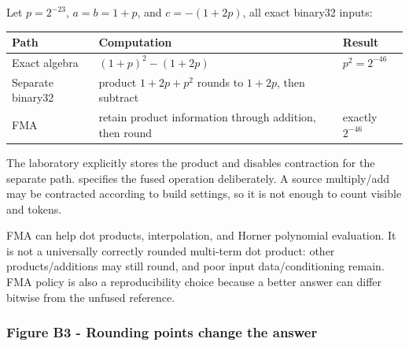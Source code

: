 Let \(p=2^{-23}\), \(a=b=1+p\), and \(c=-(1+2p)\), all exact binary32 inputs:

{\def\LTcaptype{none} %
\begin{longtable}[]{@{}
  >{\raggedright\arraybackslash}p{}
  >{\raggedright\arraybackslash}p{}
  >{\raggedright\arraybackslash}p{}@{}}
\toprule\noalign{}
\begin{minipage}[b]{\linewidth}\raggedright
Path
\end{minipage} & \begin{minipage}[b]{\linewidth}\raggedright
Computation
\end{minipage} & \begin{minipage}[b]{\linewidth}\raggedright
Result
\end{minipage} \\
\midrule\noalign{}
\endhead
\bottomrule\noalign{}
\endlastfoot
Exact algebra & \((1+p)^2-(1+2p)\) & \(p^2=2^{-46}\) \\
Separate binary32 & product \(1+2p+p^2\) rounds to \(1+2p\), then subtract & 0 \\
FMA & retain product information through addition, then round & exactly \(2^{-46}\) \\
\end{longtable}
}

The laboratory explicitly stores the product and disables contraction for the separate path.  specifies the fused operation deliberately. A source multiply/add may be contracted according to build settings, so it is not enough to count visible \BookInlineCode{*} and \BookInlineCode{+} tokens.

FMA can help dot products, interpolation, and Horner polynomial evaluation. It is not a universally correctly rounded multi-term dot product: other products/additions may still round, and poor input data/conditioning remain. FMA policy is also a reproducibility choice because a better answer can differ bitwise from the unfused reference.

\subsubsection{Figure B3 - Rounding points change the answer}\label{01-foundations-i-ch001-figure-b3---rounding-points-change-the-answer}

\hypertarget{01-foundations-i-ch001-figure-b3---rounding-points-change-the-answer}{}

